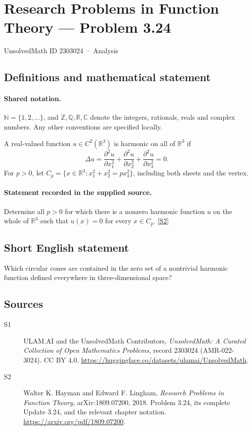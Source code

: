 \documentclass[11pt]{book}
\newcommand{\sref}[2]{\hyperlink{source:#1:#2}{[S#2]}}
\begin{document}
\setcounter{section}{2303023}
\section{Research Problems in Function Theory — Problem 3.24}\label{2303024}
{\small\sffamily UnsolvedMath ID 2303024 · Analysis}
\subsection{Definitions and mathematical statement}

\paragraph{Shared notation.}$\mathbb N=\{1,2,\ldots\}$, and $\mathbb Z,\mathbb Q,\mathbb R,\mathbb C$ denote the integers, rationals, reals and complex numbers. Any other conventions are specified locally.


A real-valued function $u\in C^2(\mathbb R^3)$ is harmonic on all of $\mathbb R^3$ if
\[\Delta u=\frac{\partial^2u}{\partial x_1^2}+\frac{\partial^2u}{\partial x_2^2}+\frac{\partial^2u}{\partial x_3^2}=0.
\]
For $p>0$, let $C_p=\{x\in\mathbb R^3:x_1^2+x_2^2=px_3^2\}$, including both sheets and the vertex.
\paragraph{Statement recorded in the supplied source.}
Determine all $p>0$ for which there is a nonzero harmonic function $u$ on the whole of $\mathbb R^3$ such that $u(x)=0$ for every $x\in C_p$. \sref{2303024}{2}
\subsection{Short English statement}
Which circular cones are contained in the zero set of a nontrivial harmonic function defined everywhere in three-dimensional space?
\subsection{Sources}
\begin{description}
\item[\hypertarget{source:2303024:1}{S1}] ULAM.AI and the UnsolvedMath Contributors, \emph{UnsolvedMath: A Curated Collection of Open Mathematics Problems}, record 2303024 (AMR-022-3024). CC BY 4.0. \url{https://huggingface.co/datasets/ulamai/UnsolvedMath}.
\item[\hypertarget{source:2303024:2}{S2}] Walter K. Hayman and Edward F. Lingham, \emph{Research Problems in Function Theory}, arXiv:1809.07200, 2018. Problem 3.24, its complete Update 3.24, and the relevant chapter notation. \url{https://arxiv.org/pdf/1809.07200}.
\end{description}
\label{end:2303024}
\end{document}
